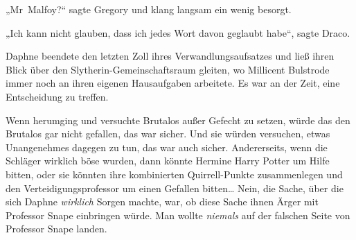 „Mr~Malfoy?“ sagte Gregory und klang langsam ein wenig besorgt.

„Ich kann nicht glauben, dass ich jedes Wort davon geglaubt habe“, sagte Draco.

\later

Daphne beendete den letzten Zoll ihres Verwandlungsaufsatzes und ließ ihren Blick über den Slytherin-Gemeinschaftsraum gleiten, wo Millicent Bulstrode immer noch an ihren eigenen Hausaufgaben arbeitete. Es war an der Zeit, eine Entscheidung zu treffen.

Wenn \SPHEW herumging und versuchte Brutalos außer Gefecht zu setzen, würde das den Brutalos gar nicht gefallen, das war sicher. Und sie würden versuchen, etwas Unangenehmes dagegen zu tun, das war auch sicher. Andererseits, wenn die Schläger wirklich böse wurden, dann könnte Hermine Harry Potter um Hilfe bitten, oder sie könnten ihre kombinierten Quirrell-Punkte zusammenlegen und den Verteidigungsprofessor um einen Gefallen bitten… Nein, die Sache, über die sich Daphne \emph{wirklich} Sorgen machte, war, ob diese Sache ihnen Ärger mit Professor Snape einbringen würde. Man wollte \emph{niemals} auf der falschen Seite von Professor Snape landen.

